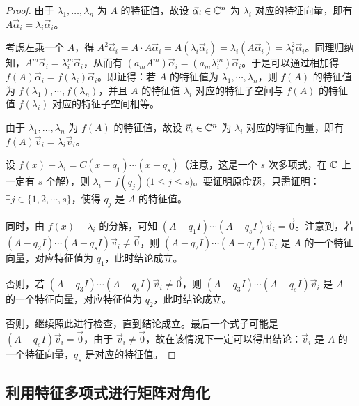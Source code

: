 \begin{proof}
	由于 $\lambda_1, \ldots, \lambda_n$ 为 $A$ 的特征值，故设 $\vec \alpha_i \in \mathbb C^n$ 为 $\lambda_i$ 对应的特征向量，即有 $A \vec \alpha_i = \lambda_i \vec \alpha_i$。

	考虑左乘一个 $A$，得 $A^2 \vec \alpha_i = A \cdot A \vec \alpha_i = A (\lambda_i \vec \alpha_i) = \lambda_i (A \vec \alpha_i) = \lambda_i^2 \vec \alpha_i$。同理归纳知，$A^m \vec \alpha_i = \lambda_i^m \vec \alpha_i$，从而有 $(a_m A^m) \vec \alpha_i = (a_m \lambda_i^m) \vec \alpha_i$。于是可以通过相加得 $f(A) \vec \alpha_i = f(\lambda_i) \vec \alpha_i$。即证得：若 $A$ 的特征值为 $\lambda_1, \cdots, \lambda_n$，则 $f(A)$ 的特征值为 $f(\lambda_1), \cdots, f(\lambda_n)$，并且 $A$ 的特征值 $\lambda_i$ 对应的特征子空间与 $f(A)$ 的特征值 $f(\lambda_i)$ 对应的特征子空间相等。

	\bigskip

	由于 $\lambda_1, \ldots, \lambda_n$ 为 $f(A)$ 的特征值，故设 $\vec v_i \in \mathbb C^n$ 为 $\lambda_i$ 对应的特征向量，即有 $f(A) \vec v_i = \lambda_i \vec v_i$。

	设 $f(x) - \lambda_i = C(x - q_1) \cdots (x - q_s)$（注意，这是一个 $s$ 次多项式，在 $\mathbb C$ 上一定有 $s$ 个解），则 $\lambda_i = f(q_j) \pod{1 \le j \le s}$。要证明原命题，只需证明：$\exists j \in \{1, 2, \cdots, s\}$，使得 $q_j$ 是 $A$ 的特征值。

	同时，由 $f(x) - \lambda_i$ 的分解，可知 $(A - q_1 I) \cdots (A - q_s I) \vec v_i = \vec 0$。注意到，若 $(A - q_2 I) \cdots (A - q_s I) \vec v_i \ne \vec 0$，则 $(A - q_2 I) \cdots (A - q_s I) \vec v_i$ 是 $A$ 的一个特征向量，对应特征值为 $q_1$，此时结论成立。

	否则，若 $(A - q_3 I) \cdots (A - q_s I) \vec v_i \ne \vec 0$，则 $(A - q_3 I) \cdots (A - q_s I) \vec v_i$ 是 $A$ 的一个特征向量，对应特征值为 $q_2$，此时结论成立。

	否则，继续照此进行检查，直到结论成立。最后一个式子可能是 $(A - q_s I) \vec v_i = \vec 0$，由于 $\vec v_i \ne \vec 0$，故在该情况下一定可以得出结论：$\vec v_i$ 是 $A$ 的一个特征向量，$q_s$ 是对应的特征值。
\end{proof}

\subsection{利用特征多项式进行矩阵对角化}

